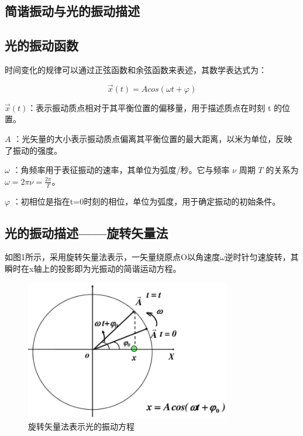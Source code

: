\documentclass[withoutpreface,bwprint]{cumcmthesis} %
\begin{document}
\newpage
\begin{appendices}
    \section{简谐振动与光的振动描述}
    \subsection{光的振动函数}
    时间变化的规律可以通过正弦函数和余弦函数来表述，其数学表达式为：

    \[\overrightarrow{x}(t) = Acos(\omega t + \varphi)\]

    \(\overrightarrow{x}(t)\)：表示振动质点相对于其平衡位置的偏移量，用于描述质点在时刻 t 的位置。

    \(A\) ：光矢量的大小表示振动质点偏离其平衡位置的最大距离，以米为单位，反映了振动的强度。

    \(\omega\) ：角频率用于表征振动的速率，其单位为弧度/秒。它与频率 \(\nu\) 周期 \(T\) 的关系为 \(\omega = 2\pi\nu = \frac{2\pi}{T}\)。

    \(\varphi\) ：初相位是指在t=0时刻的相位，单位为弧度，用于确定振动的初始条件。

    \subsection{光的振动描述——旋转矢量法}
    如图1所示，采用旋转矢量法表示，一矢量绕原点O以角速度$\omega$逆时针匀速旋转，其瞬时在x轴上的投影即为光振动的简谐运动方程。

    \begin{figure}[!h]
        \centering
        \includegraphics[width=0.8\textwidth]{figures/figure1.png} %

        \caption{旋转矢量法表示光的振动方程}
        \label{fig:1}
    \end{figure}


\end{appendices}
\end{document}

